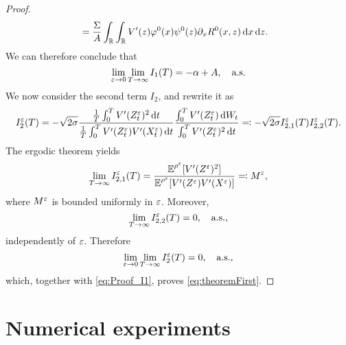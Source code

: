\documentclass[10pt]{article}
\begin{document}
\begin{proof}
\begin{align}
	&= \frac{\Sigma}{A} \int_{\mathbb{R}} \int_{\mathbb{R}} V'(z) \varphi^0(x) \psi^0(z) \partial_x R^0(x,z) \,\mathrm{d} x \,\mathrm{d} z.
\end{align}
We can therefore conclude that
\begin{equation}\label{eq:Proof_I1}
\lim_{\varepsilon \to 0} \lim_{T \to \infty} I_1(T) = -\alpha + A, \quad \text{a.s.}
\end{equation}
We now consider the second term $I_2$, and rewrite it as 
\begin{equation}
	I^\varepsilon_2(T) = - \sqrt{2\sigma} \frac{\frac1T\int_0^T V'(Z^\varepsilon_t)^2 \,\mathrm{d} t}{\frac1T\int_0^T V'(Z^\varepsilon_t) V'(X^\varepsilon_t) \,\mathrm{d} t} \frac{\int_0^T V'(Z^\varepsilon_t) \,\mathrm{d} W_t}{\int_0^T V'(Z^\varepsilon_t)^2 \,\mathrm{d} t} \eqqcolon -\sqrt{2\sigma} I_{2,1}^\varepsilon(T)  I_{2,2}^\varepsilon(T).
\end{equation}
The ergodic theorem yields
\begin{equation}
	\lim_{T \to \infty} I_{2,1}^\varepsilon(T) = \frac{\operatorname{\mathbb{E}}^{\rho^\varepsilon}[V'(Z^\varepsilon)^2]}{\operatorname{\mathbb{E}}^{\rho^\varepsilon}[V'(Z^\varepsilon)V'(X^\varepsilon)]} \eqqcolon M^\varepsilon,
\end{equation}
where $M^\varepsilon$ is bounded uniformly in $\varepsilon$. Moreover, 
\begin{equation}
	\lim_{T \to \infty} I_{2,2}^\varepsilon(T) = 0, \quad \text{a.s.},
\end{equation}
independently of $\varepsilon$. Therefore
\begin{equation}
	\lim_{\varepsilon \to 0}\lim_{T \to \infty} I_2^\varepsilon(T) = 0, \quad \text{a.s.},
\end{equation}
which, together with \eqref{eq:Proof_I1}, proves \eqref{eq:theoremFirst}. 
\end{proof}

\section{Numerical experiments}




\end{document}

